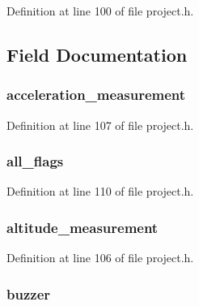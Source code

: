 \-Definition at line 100 of file project.\-h.



\subsection{\-Field \-Documentation}
\hypertarget{unions__request__flags_a8bfa9030e5a42a8c4745e82e25c0cd57}{
\subsubsection[{acceleration\-\_\-measurement}]{ {\bf acceleration\-\_\-measurement}}}\label{unions__request__flags_a8bfa9030e5a42a8c4745e82e25c0cd57}


\-Definition at line 107 of file project.\-h.

\hypertarget{unions__request__flags_abf876e68df8575f02084e137cc49266b}{
\subsubsection[{all\-\_\-flags}]{ {\bf all\-\_\-flags}}}\label{unions__request__flags_abf876e68df8575f02084e137cc49266b}


\-Definition at line 110 of file project.\-h.

\hypertarget{unions__request__flags_af1788224f8cde9b265d4426ec54989ed}{
\subsubsection[{altitude\-\_\-measurement}]{ {\bf altitude\-\_\-measurement}}}\label{unions__request__flags_af1788224f8cde9b265d4426ec54989ed}


\-Definition at line 106 of file project.\-h.

\hypertarget{unions__request__flags_a63ef67704ea037b7bd26848aa05a5fa4}{
\subsubsection[{buzzer}]{ {\bf buzzer}}}\label{unions__request__flags_a63ef67704ea037b7bd26848aa05a5fa4}


